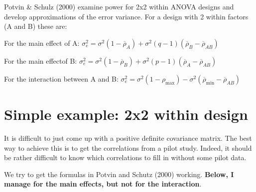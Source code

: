 \documentclass[]{book}
\begin{document}
Potvin \& Schulz (2000) examine power for 2x2 within ANOVA designs and develop approximations of the error variance. For a design with 2 within factors (A and B) these are:

For the main effect of A:
\(\sigma _ { e } ^ { 2 } = \sigma ^ { 2 } ( 1 - \overline { \rho } _ { A } ) + \sigma ^ { 2 } ( q - 1 ) ( \overline { \rho } _ { B } - \overline { \rho } _ { AB } )\)

For the main effectof B:
\(\sigma _ { e } ^ { 2 } = \sigma ^ { 2 } ( 1 - \overline { \rho } _ { B } ) + \sigma ^ { 2 } ( p - 1 ) ( \overline { \rho } _ { A } - \overline { \rho } _ { A B } )\)

For the interaction between A and B:
\(\sigma _ { e } ^ { 2 } = \sigma ^ { 2 } ( 1 - \rho _ { \max } ) - \sigma ^ { 2 } ( \overline { \rho } _ { \min } - \overline { \rho } _ { AB } )\)

\hypertarget{simple-example-2x2-within-design}{%
\section{Simple example: 2x2 within design}\label{simple-example-2x2-within-design}}

It is difficult to just come up with a positive definite covariance matrix. The best way to achieve this is to get the correlations from a pilot study. Indeed, it should be rather difficult to know which correlations to fill in without some pilot data.

We try to get the formulas in Potvin and Schutz (2000) working. \textbf{Below, I manage for the main effects, but not for the interaction}.
\end{document}
